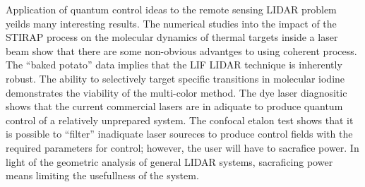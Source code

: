 Application of quantum control ideas to the remote sensing LIDAR problem yeilds many interesting results. The numerical studies into the impact of the STIRAP process on the molecular dynamics of thermal targets inside a laser beam show that there are some non-obvious advantges to using coherent process. The ``baked potato'' data implies that the LIF LIDAR technique is inherently robust. The ability to selectively target specific transitions in molecular iodine demonstrates the viability of the multi-color method. The dye laser diagnositic shows that the current commercial lasers are in adiquate to produce quantum control of a relatively unprepared system. The confocal etalon test shows that it is possible to ``filter'' inadiquate laser soureces to produce control fields with the required parameters for control; however, the user will have to sacrafice power. In light of the geometric analysis of general LIDAR systems, sacraficing power means limiting the usefullness of the system.

